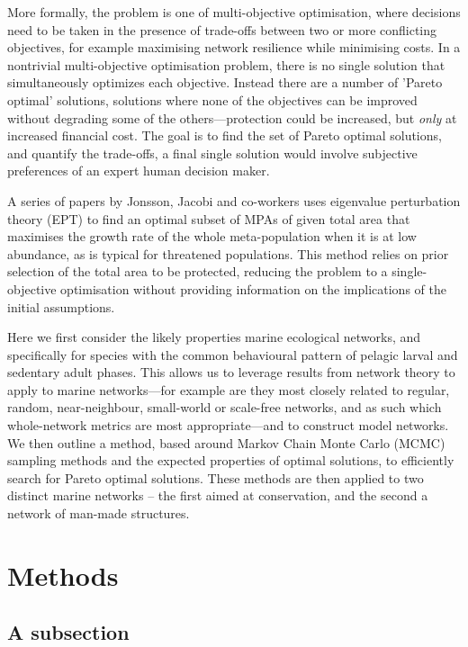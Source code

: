 \documentclass[11pt]{article} %
\begin{document}
More formally, the problem is one of multi-objective optimisation, where decisions need to be taken in the presence of trade-offs between two or more conflicting objectives, for example maximising network resilience while minimising costs. In a nontrivial multi-objective optimisation problem, there is no single solution that simultaneously optimizes each objective. Instead there are a number of 'Pareto optimal' solutions, solutions where none of the objectives can be improved without degrading some of the others---protection could be increased, but \textit{only} at increased financial cost. The goal is to find the set of Pareto optimal solutions, and quantify the trade-offs, a final single solution would involve subjective preferences of an expert human decision maker.

A series of papers by Jonsson, Jacobi and co-workers uses eigenvalue perturbation theory (EPT) to find an optimal subset of MPAs of given total area that maximises the growth rate of the whole meta-population when it is at low abundance, as is typical for threatened populations. This method relies on prior selection of the total area to be protected, reducing the problem to a single-objective optimisation without providing information on the implications of the initial assumptions.

Here we first consider the likely properties marine ecological networks, and specifically for species with the common behavioural pattern of pelagic larval and sedentary adult phases. This allows us to leverage results from network theory to apply to marine networks---for example are they most closely related to regular, random, near-neighbour, small-world or scale-free networks, and as such which whole-network metrics are most appropriate---and to construct model networks. We then outline a method, based around Markov Chain Monte Carlo (MCMC) sampling methods and the expected properties of optimal solutions, to efficiently search for Pareto optimal solutions. These methods are then applied to two distinct marine networks -- the first aimed at conservation, and the second a network of man-made structures.

\section{Methods}


\subsection{A subsection}






\printbibliography
\end{document}
